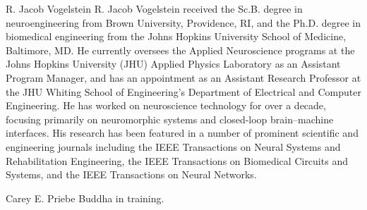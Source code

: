 \documentclass[10pt,journal,cspaper,compsoc]{IEEEtran}
\begin{document}
\begin{IEEEbiographynophoto}{R. Jacob Vogelstein}
R. Jacob Vogelstein received the Sc.B. degree in neuroengineering from Brown University, Providence, RI, and the Ph.D. degree in biomedical engineering from the Johns Hopkins University School of Medicine, Baltimore, MD.  He currently oversees the Applied Neuroscience programs at the Johns Hopkins University (JHU) Applied Physics Laboratory as an Assistant Program Manager, and has an appointment as an Assistant Research Professor at the JHU Whiting School of Engineering’s Department of Electrical and Computer Engineering. He has worked on neuroscience technology for over a decade, focusing primarily on neuromorphic systems and closed-loop brain–machine interfaces. His research has been featured in a number of prominent scientific and engineering journals including the IEEE Transactions on Neural Systems and Rehabilitation Engineering, the IEEE Transactions on Biomedical Circuits and Systems, and the IEEE Transactions on Neural Networks.  
\end{IEEEbiographynophoto}

\begin{IEEEbiography}{Carey E. Priebe}
Buddha in training.
\end{IEEEbiography}

\end{document}
